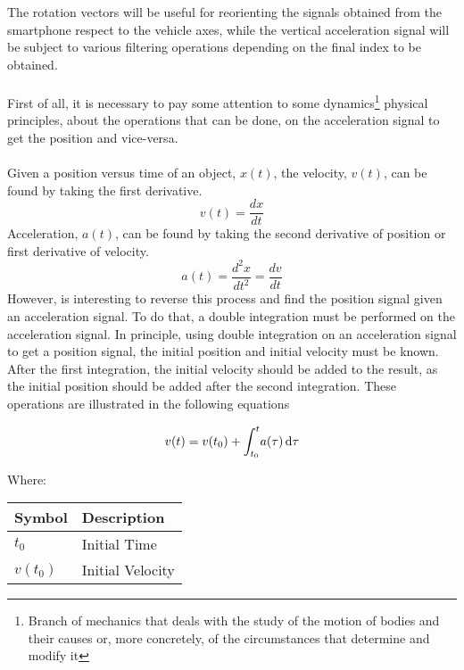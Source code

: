 \documentclass[tesi]{subfiles}
\begin{document}
\noindent The rotation vectors will be useful for reorienting the signals obtained from the smartphone\cite{Andro} respect to the vehicle axes, while the vertical acceleration signal will be subject to various filtering operations depending on the final index to be obtained.\\\\
First of all, it is necessary to pay some attention to some dynamics\footnote{Branch of mechanics that deals with the study of the motion of bodies and their causes or, more concretely, of the circumstances that determine and modify it} physical principles, about the operations that can be done, on the acceleration signal to get the position and vice-versa.\\\\
Given a position versus time of an object, $x(t)$, the velocity, $v(t)$, can be found by taking the first derivative.\\
\begin{equation}
v(t) = \dfrac{dx}{dt}
\end{equation}\label{eq:velocity}
Acceleration, $a(t)$, can be found by taking the second derivative of position or first
derivative of velocity.
\begin{equation}
a(t) = \dfrac{d^{2}x}{dt^{2}} = \dfrac{dv}{dt}
\end{equation}\label{eq:displacement}
However, is interesting to reverse this process and find the position signal given an acceleration signal. To do that, a double integration must be performed on the acceleration signal.
In principle, using double integration on an acceleration signal to get a position signal, the initial position and initial velocity must be known. After the first integration, the initial velocity should be added to the result, as the initial position should be added after the second integration. These operations are illustrated in the following equations
\begin{center}
\begin{equation}
 {\large v(t) = v(t_{0}) + \int_{t_{0}}^{t} \! a(\tau) \, \mathrm{d}\tau}
\end{equation}

Where: \\
\begin{table}[ht]
\centering
    \begin{tabular}{ | l | l |}
    
    \hline
    Symbol & Description \\ \hline
   \quad  $t_{0}$ & Initial Time \\ \hline
	   \quad  $v(t_{0})$ & Initial Velocity\\  
\hline 
    \end{tabular}
\end{table}
\end{center}
\end{document}
